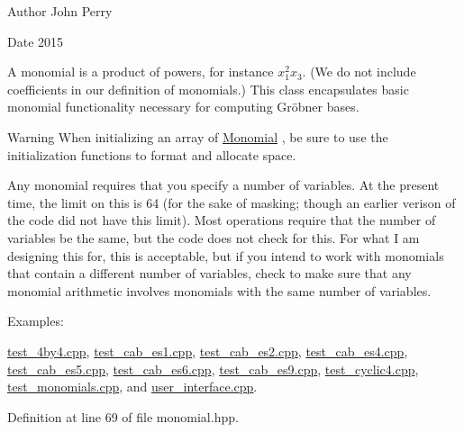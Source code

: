 \begin{DoxyAuthor}{Author}
John Perry 
\end{DoxyAuthor}
\begin{DoxyDate}{Date}
2015
\end{DoxyDate}
A monomial is a product of powers, for instance $x_1^2x_3$. (We do not include coefficients in our definition of monomials.) This class encapsulates basic monomial functionality necessary for computing Gr\"{o}bner bases.

\begin{DoxyWarning}{Warning}
When initializing an array of {\ttfamily \hyperlink{group__polygroup_class_monomial}{Monomial}} , be sure to use the initialization functions to format and allocate space.

Any monomial requires that you specify a number of variables. At the present time, the limit on this is 64 (for the sake of masking; though an earlier verison of the code did not have this limit). Most operations require that the number of variables be the same, but the code does not check for this. For what I am designing this for, this is acceptable, but if you intend to work with monomials that contain a different number of variables, check to make sure that any monomial arithmetic involves monomials with the same number of variables. 
\end{DoxyWarning}
\begin{Desc}
\item[Examples\+: ]\par
\hyperlink{test_4by4_8cpp-example}{test\+\_\+4by4.\+cpp}, \hyperlink{test_cab_es1_8cpp-example}{test\+\_\+cab\+\_\+es1.\+cpp}, \hyperlink{test_cab_es2_8cpp-example}{test\+\_\+cab\+\_\+es2.\+cpp}, \hyperlink{test_cab_es4_8cpp-example}{test\+\_\+cab\+\_\+es4.\+cpp}, \hyperlink{test_cab_es5_8cpp-example}{test\+\_\+cab\+\_\+es5.\+cpp}, \hyperlink{test_cab_es6_8cpp-example}{test\+\_\+cab\+\_\+es6.\+cpp}, \hyperlink{test_cab_es9_8cpp-example}{test\+\_\+cab\+\_\+es9.\+cpp}, \hyperlink{test_cyclic4_8cpp-example}{test\+\_\+cyclic4.\+cpp}, \hyperlink{test_monomials_8cpp-example}{test\+\_\+monomials.\+cpp}, and \hyperlink{user_interface_8cpp-example}{user\+\_\+interface.\+cpp}.\end{Desc}


Definition at line 69 of file monomial.\+hpp.

